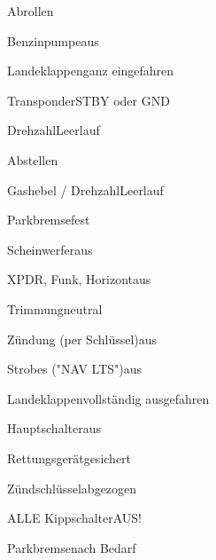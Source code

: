 \begin{checklist}{Abrollen}
	\item{Benzinpumpe}{aus}
	\item{Landeklappen}{ganz eingefahren}
	\item{Transponder}{STBY oder GND}
	\item{Drehzahl}{Leerlauf}
\end{checklist}

\begin{checklist}{Abstellen}
	  \item{Gashebel / Drehzahl}{Leerlauf}
	  \item{Parkbremse}{fest}
	  \item{Scheinwerfer}{aus}
	  \item{XPDR, Funk, Horizont}{aus}
	  \item{Trimmung}{neutral}
	  \item{Zündung (per Schlüssel)}{aus}
	  
	  \item{Strobes ("NAV LTS")}{aus}
	  \item{Landeklappen}{vollständig ausgefahren}
	  \item{Hauptschalter}{aus}
	  \item{Rettungsgerät}{gesichert}
	  \item{Zündschlüssel}{abgezogen}
	  
	  \item{ALLE Kippschalter}{AUS!}
	  \item{Parkbremse}{nach Bedarf}
\end{checklist}


